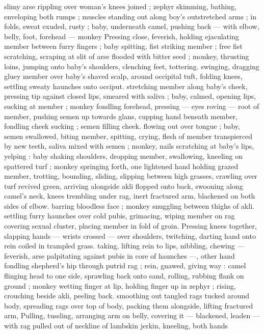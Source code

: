 slimy arse rippling over woman's knees joined ; zephyr skimming, 
bathing, enveloping both rumps ; muscles standing out along boy's 
outstretched arms ; in folds, sweat exuded, rusty ; baby, underneath 
camel, pushing back --- with elbow, belly, foot, forehead --- monkey 
Pressing close, feverish, holding ejaculating member between furry 
fingers ; baby spitting, fist striking member ; free fist scratching, 
scraping at slit of arse flooded with bitter seed ; monkey, thrusting 
loins, jumping onto baby's shoulders, clenching feet, tottering. 
swinging, dragging gluey member over baby's shaved scalp, around 
occipital tuft, folding knees, settling sweaty haunches onto occiput. 
stretching member along baby's cheek, pressing tip against closed 
lips, smeared with saliva ; baby, calmed, opening lips, sucking at 
member ; monkey fondling forehead, pressing --- eyes roving --- 
root of member, pushing semen up towards glans, cupping hand 
beneath member, fondling cheek sucking ; semen filling cheek. 
flowing out over tongue ; baby, semen swallowed, biting member, 
spitting, crying, flesh of member transpierced by new teeth, saliva 
mixed with semen ; monkey, nails scratching at baby's lips, yelping : 
baby shaking shoulders, dropping member, swallowing, kneeling on 
spattered turf ; monkey springing forth, one lightened hand holding 
grazed member, trotting, bounding, sliding, slipping between high 
grasses, crawling over turf revived green, arriving alongside akli 
flopped onto back, swooning along camel's neck, knees trembling 
under rag, inert fractured arm, blackened on both sides of elbow. 
barring bloodless face ; monkey snuggling between thighs of akli. 
settling furry haunches over cold pubis, grimacing, wiping member 
on rag covering sexual cluster, placing member in fold of groin. 
Pressing knees together, slapping hands --- wrists crossed --- over 
shoulders, twitching, darting hand onto rein coiled in trampled grass. 
taking, lifting rein to lips, nibbling, chewing --- feverish, arse 
palpitating against pubis in core of haunches ---, other hand 
fondling shepherd's hip through putrid rag ; rein, gnawed, giving way 
: camel flinging head to one side, sprawling back onto sand, rolling, 
rubbing flank on ground ; monkey wetting finger at lip, holding finger 
up in zephyr ; rising, crouching beside akli, peeling back. smoothing 
out tangled rags tucked around body, spreading rags over top of 
body, packing them alongside, lifting fractured arm, Pulling, tussling, 
arranging arm on belly, covering it --- blackened, leaden --- with rag 
pulled out of neckline of lambskin jerkin, kneeling, both hands 
